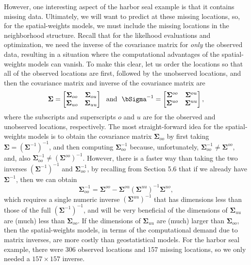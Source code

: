 \documentclass[12pt, titlepage]{article}
\begin{document}
However, one interesting aspect of the harbor seal example is that it contains missing data.  Ultimately, we will want to predict at these missing locations, so, for the spatial-weights models, we must include the missing locations in the neighborhood structure.  Recall that for the likelhood evaluations and optimization, we need the inverse of the covariance matrix for \textit{only} the observed data, resulting in a situation where the computational advantages of the spatial-weights models can vanish. To make this clear, let us order the locations so that all of the observed locations are first, followed by the unobserved locations, and then the covariance matrix and inverse of the covariance matrix are
$$
    \boldsymbol{\Sigma} = 
    \begin{bmatrix}
       \boldsymbol{\Sigma}_{oo} & \boldsymbol{\Sigma}_{ou} \\
       \boldsymbol{\Sigma}_{uo} & \boldsymbol{\Sigma}_{uu}
    \end{bmatrix}  \ \textrm{ and } \  
    \bSigma^{-1} = 
    \begin{bmatrix}
       \boldsymbol{\Sigma}^{oo} & \boldsymbol{\Sigma}^{ou} \\
       \boldsymbol{\Sigma}^{uo} & \boldsymbol{\Sigma}^{uu}
    \end{bmatrix}, 
$$
where the subscripts and superscripts $o$ and $u$ are for the observed and unobserved locations, respectively. The most straight-forward idea for the spatial-weights models is to obtain the covariance matrix $\boldsymbol{\Sigma}_{oo}$ by first taking $\boldsymbol{\Sigma} = (\boldsymbol{\Sigma}^{-1})^{-1}$, and then computing $\boldsymbol{\Sigma}_{oo}^{-1}$ because, unfortunately, $\boldsymbol{\Sigma}_{oo}^{-1} \neq \boldsymbol{\Sigma}^{oo}$, and, also $\boldsymbol{\Sigma}_{oo}^{-1} \neq (\boldsymbol{\Sigma}^{oo})^{-1}$. However, there is a faster way than taking the two inverses $(\boldsymbol{\Sigma}^{-1})^{-1}$ and $\boldsymbol{\Sigma}_{oo}^{-1}$, by recalling from Section 5.6 that if we already have $\boldsymbol{\Sigma}^{-1}$, then we can obtain 
$$
    \boldsymbol{\Sigma}_{oo}^{-1} = \boldsymbol{\Sigma}^{oo} - \boldsymbol{\Sigma}^{ou} (\boldsymbol{\Sigma}^{uu})^{-1} \boldsymbol{\Sigma}^{uo},
$$
which requires a single numeric inverse $(\boldsymbol{\Sigma}^{uu})^{-1}$ that has dimensions less than those of the full $(\boldsymbol{\Sigma}^{-1})^{-1}$, and will be very beneficial of the dimensions of $\boldsymbol{\Sigma}_{uu}$ are (much) less than $\boldsymbol{\Sigma}_{oo}$.  If the dimensions of $\boldsymbol{\Sigma}_{uu}$ are (much) larger than $\boldsymbol{\Sigma}_{oo}$, then the spatial-weights models, in terms of the computational demand due to matrix inverses, are more costly than geostatistical models.  For the harbor seal example, there were 306 observed locations and 157 missing locations, so we only needed a $157 \times 157$ inverse. 
\end{document}
